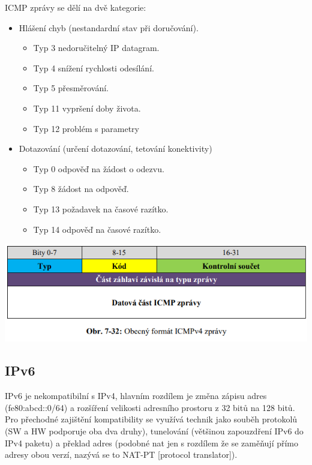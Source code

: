 ICMP zprávy se dělí na dvě kategorie:
\begin{itemize}[noitemsep]
    \item Hlášení chyb (nestandardní stav při doručování).
    \begin{itemize}[noitemsep]
        \item Typ 3 nedoručitelný IP datagram.
        \item Typ 4 snížení rychlosti odesílání.
        \item Typ 5 přesměrování.
        \item Typ 11 vypršení doby života.
        \item Typ 12 problém s parametry
    \end{itemize}
    \item Dotazování (určení dotazování, tetování konektivity)
    \begin{itemize}[noitemsep]
        \item Typ 0 odpověď na žádost o odezvu.
        \item Typ 8 žádost na odpověď.
        \item Typ 13 požadavek na časové razítko.
        \item Typ 14 odpověď na časové razítko.
    \end{itemize}
\end{itemize}

\begin{center}
	\includegraphics[scale=0.5]{images/-044.png}
\end{center}

\subsection{IPv6}

IPv6 je nekompatibilní s IPv4, hlavním rozdílem je změna zápisu adres (fe80:abcd::0/64) a rozšíření velikosti adresního prostoru z 32 bitů na 128 bitů. Pro přechodné zajištění kompatibility se využívá technik jako souběh protokolů (SW a HW podporuje oba dva druhy), tunelování (většinou zapouzdření IPv6 do IPv4 paketu) a překlad adres (podobné nat jen s rozdílem že se zaměňují přímo adresy obou verzí, nazývá se to NAT-PT [protocol translator]).

